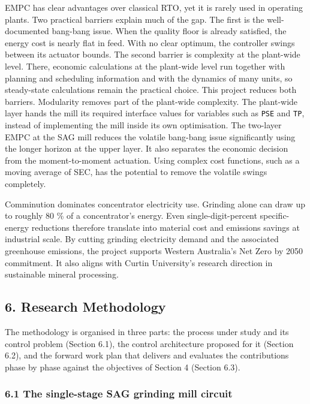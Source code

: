 \documentclass[
  14pt,
]{extarticle}
\begin{document}
EMPC has clear advantages over classical RTO, yet it is rarely used in
operating plants. Two practical barriers explain much of the gap. The
first is the well-documented bang-bang issue. When the quality floor is
already satisfied, the energy cost is nearly flat in feed. With no clear
optimum, the controller swings between its actuator bounds. The second
barrier is complexity at the plant-wide level. There, economic
calculations at the plant-wide level run together with planning and
scheduling information and with the dynamics of many units, so
steady-state calculations remain the practical choice. This project reduces both barriers. Modularity removes
part of the plant-wide complexity. The plant-wide layer hands the mill
its required interface values for variables such as \texttt{PSE} and
\texttt{TP}, instead of implementing the mill inside its own
optimisation. The two-layer EMPC at the SAG mill reduces the volatile
bang-bang issue significantly using the longer horizon at the upper
layer. It
also separates the economic decision from the moment-to-moment
actuation. Using
complex cost functions, such as a moving average of SEC, has the
potential to remove the volatile swings completely.

Comminution dominates concentrator electricity use. Grinding alone can
draw up to roughly 80 \% of a concentrator's energy. Even
single-digit-percent specific-energy reductions therefore translate into
material cost and emissions savings at industrial scale. By cutting
grinding electricity demand and the associated greenhouse emissions, the
project supports Western Australia's Net Zero by 2050 commitment. It
also aligns with Curtin University's research direction in sustainable
mineral processing.

\subsection{6. Research Methodology}\label{research-methodology}

The methodology is organised in three parts: the process under study and
its control problem (Section 6.1), the control architecture proposed for
it (Section 6.2), and the forward work plan that delivers and evaluates
the contributions phase by phase against the objectives of Section 4
(Section 6.3).

\subsubsection{6.1 The single-stage SAG grinding mill
circuit}\label{the-single-stage-sag-grinding-mill-circuit}
\end{document}
